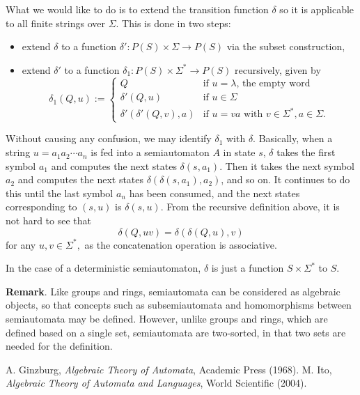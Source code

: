 \documentclass[12pt]{article}
\begin{document}
What we would like to do is to extend the transition function $\delta$ so it is applicable to all finite strings over $\Sigma$.  This is done in two steps: 
\begin{itemize}
\item extend $\delta$ to a function $\delta': P(S)\times \Sigma \to P(S)$ via the subset construction,
\item extend $\delta'$ to a function $\delta_1: P(S)\times \Sigma^*\to P(S)$ recursively, given by 
\begin{displaymath}
\delta_1(Q,u):= \left\{
\begin{array}{ll}
Q & \textrm{if $u=\lambda$, the empty word}\\
\delta'(Q,u) & \textrm{if $u\in \Sigma$}\\
\delta'(\delta'(Q,v),a) & \textrm{if $u=v a$ with $v\in \Sigma^*,a\in \Sigma.$}
\end{array}
\right.
\end{displaymath}
\end{itemize}
Without causing any confusion, we may identify $\delta_1$ with $\delta$.  Basically, when a string $u=a_1a_2\cdots a_n$ is fed into a semiautomaton $A$ in state $s$, $\delta$ takes the first symbol $a_1$ and computes the next states $\delta(s,a_1)$.  Then it takes the next symbol $a_2$ and computes the next states $\delta(\delta(s,a_1),a_2)$, and so on.  It continues to do this until the last symbol $a_n$ has been consumed, and the next states corresponding to $(s,u)$ is $\delta(s,u)$.  From the recursive definition above, it is not hard to see that $$\delta(Q,uv)=\delta(\delta(Q,u),v)$$ for any $u,v\in \Sigma^*,$ as the concatenation operation is associative.

In the case of a deterministic semiautomaton, $\delta$ is just a function $S\times \Sigma^*$ to $S$.

\textbf{Remark}.  Like groups and rings, semiautomata can be considered as algebraic objects, so that concepts such as subsemiautomata and homomorphisms between semiautomata may be defined.  However, unlike groups and rings, which are defined based on a single set, semiautomata are two-sorted, in that two sets are needed for the definition.

\begin{thebibliography}{8}
 A. Ginzburg, {\em Algebraic Theory of Automata}, Academic Press (1968).
 M. Ito, \emph{Algebraic Theory of Automata and Languages}, World Scientific (2004).
\end{thebibliography}
\end{document}

